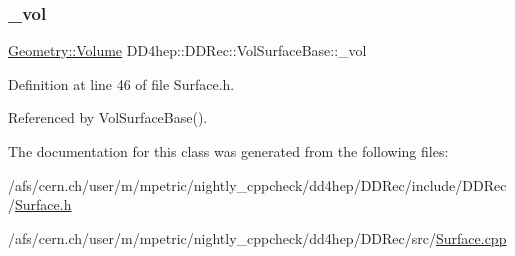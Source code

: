 \subsubsection{\texorpdfstring{\+\_\+vol}{\_vol}}
{\footnotesize\ttfamily \hyperlink{class_d_d4hep_1_1_geometry_1_1_volume}{Geometry\+::\+Volume} D\+D4hep\+::\+D\+D\+Rec\+::\+Vol\+Surface\+Base\+::\+\_\+vol\hspace{0.3cm}{\ttfamily [protected]}}



Definition at line 46 of file Surface.\+h.



Referenced by Vol\+Surface\+Base().



The documentation for this class was generated from the following files\+:\begin{DoxyCompactItemize}
\item 
/afs/cern.\+ch/user/m/mpetric/nightly\+\_\+cppcheck/dd4hep/\+D\+D\+Rec/include/\+D\+D\+Rec/\hyperlink{_surface_8h}{Surface.\+h}\item 
/afs/cern.\+ch/user/m/mpetric/nightly\+\_\+cppcheck/dd4hep/\+D\+D\+Rec/src/\hyperlink{_surface_8cpp}{Surface.\+cpp}\end{DoxyCompactItemize}
